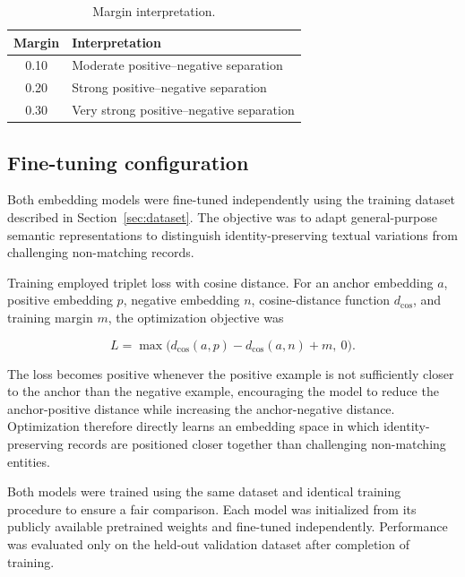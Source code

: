 \documentclass{article}
\begin{document}
\begin{table}[t]
  \caption{Margin interpretation.}
  \label{tab:margins}
  \centering
  \begin{tabular}{cl}
    \toprule
    Margin & Interpretation \\
    \midrule
    0.10 & Moderate positive--negative separation \\
    0.20 & Strong positive--negative separation \\
    0.30 & Very strong positive--negative separation \\
    \bottomrule
  \end{tabular}
\end{table}

\subsection{Fine-tuning configuration}

Both embedding models were fine-tuned independently using the training dataset described in Section~\ref{sec:dataset}. The objective was to adapt general-purpose semantic representations to distinguish identity-preserving textual variations from challenging non-matching records.

Training employed triplet loss with cosine distance. For an anchor embedding $a$, positive embedding $p$, negative embedding $n$, cosine-distance function $d_{\mathrm{cos}}$, and training margin $m$, the optimization objective was

\begin{equation}
  L = \max\big(d_{\mathrm{cos}}(a, p) - d_{\mathrm{cos}}(a, n) + m,\ 0\big).
  \label{eq:loss}
\end{equation}

The loss becomes positive whenever the positive example is not sufficiently closer to the anchor than the negative example, encouraging the model to reduce the anchor-positive distance while increasing the anchor-negative distance. Optimization therefore directly learns an embedding space in which identity-preserving records are positioned closer together than challenging non-matching entities.

Both models were trained using the same dataset and identical training procedure to ensure a fair comparison. Each model was initialized from its publicly available pretrained weights and fine-tuned independently. Performance was evaluated only on the held-out validation dataset after completion of training.
\end{document}
